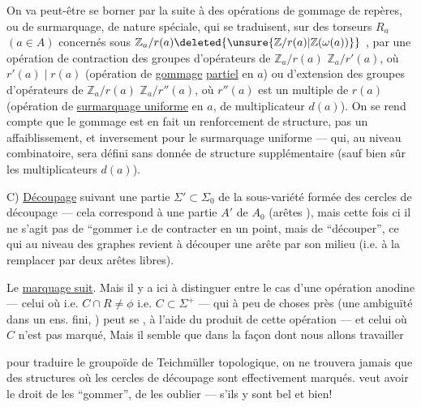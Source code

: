 On va peut-être se borner par la suite à des opérations de gommage de repères, ou de surmarquage, de nature spéciale, qui se traduisent, sur  des torseurs $R_a$ $(a\in A)$ concernés sous
$\mathbb Z_a/r(a)\deleted{\unsure{\mathbb Z/r(a)|\mathbb Z(\omega(a))}}$
,
par une opération de contraction des groupes d'opérateurs de $\mathbb Z_a/r(a)$  $\mathbb Z_a/r'(a)$, où $r'(a)\mid r(a)$
(opération de \uline{gommage} \uline{partiel}  en $a$)
ou d'extension des groupes d'opérateurs de $\mathbb Z_a/r(a)$  $\mathbb Z_a/r''(a)$, où $r''(a)$  est un multiple de $r(a)$
(opération de \uline{surmarquage uniforme} en $a$, \deleted{)} de multiplicateur $d(a)$).
On se rend compte  que le gommage  est en fait un renforcement de structure, pas un affaiblissement, et inversement pour le surmarquage uniforme --- qui, au niveau combinatoire, sera défini sans donnée de structure supplémentaire (sauf bien sûr les multiplicateurs $d(a)$).

C) \uline{Découpage}  suivant une partie 
$\Sigma'\subset\Sigma_0$ de la sous-variété formée des cercles de découpage --- cela correspond à une partie $A'$ de $A_0$ (arêtes  ), mais cette fois ci il ne s'agit pas de ``gommer i.e de contracter en un point, mais de ``découper'', ce qui au niveau des graphes revient à découper une arête par son milieu (i.e. à la remplacer par deux arêtes libres).

Le \uline{marquage suit}. 
Mais il y a ici à distinguer entre le cas d'une opération anodine  --- celui
où 
 i.e. $C\cap R\ne\phi$ i.e. $C\subset\Sigma^+$ --- qui à peu de choses près (une ambiguïté dans un ens. fini, \deleted{)} ) peut se , à l'aide du produit de cette opération --- et celui où $C$ n'est pas marqué,
Mais il semble que dans la façon dont nous allons travailler

pour  traduire le groupoïde de Teichmüller topologique, on ne trouvera jamais que des structures où les cercles de découpage sont effectivement marqués.
 veut avoir le droit de les ``gommer'', de les oublier  ---  s'ils y sont bel et bien!

